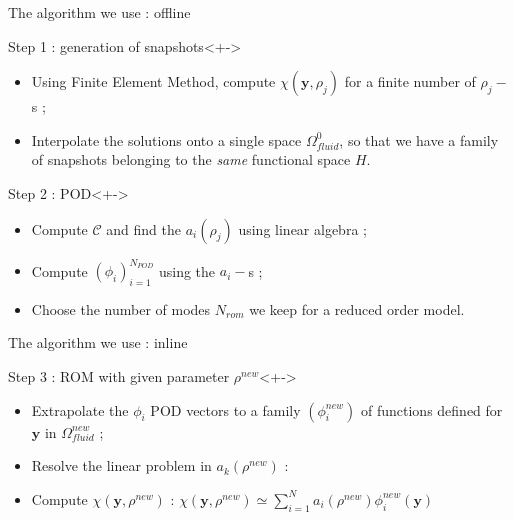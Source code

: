 \begin{frame}{The algorithm we use : offline}
%
\begin{block}{Step 1 : generation of snapshots}<+->
\begin{itemize}
\item<+-> Using Finite Element Method, compute $\chi(\mathbf{y},\rho_j)$ for a finite number of $\rho_j-$s ;
\item<+-> Interpolate the solutions onto a single space $\Omega_{fluid}^0$, %
so that we have a family of snapshots belonging to the \emph{same} functional space $H$.
\end{itemize}
\end{block}
%
\begin{block}{Step 2 : POD}<+->
\begin{itemize}
\item<+-> Compute $\mathcal{C}$ and find the $a_i(\rho_j)$ using linear algebra ;
\item<+-> Compute $(\phi_i)_{i=1}^{N_{POD}}$ using the $a_i-$s ;
\item<+-> Choose the number of modes $N_{rom}$ we keep for a reduced order model.
\end{itemize}
\end{block}
%
\end{frame}

\begin{frame}{The algorithm we use : inline}
%
\begin{block}{Step 3 : ROM with given parameter $\rho^{new}$}<+->
\begin{itemize}
\item<+-> Extrapolate the $\phi_i$ POD vectors to a family $(\phi_i^{new})$ of functions defined for $\mathbf{y}$ in $\Omega_{fluid}^{new}$ ;
\item<+-> Resolve the linear problem in $a_k(\rho^{new})$ :
\end{itemize}
\begin{itemize}
\item<+-> Compute $\chi(\mathbf{y},\rho^{new})$ : $\chi\left(\mathbf{y},\rho^{new}\right)\simeq \sum\limits_{i=1}^N a_i \left(\rho^{new}\right)\phi_i^{new}(\mathbf{y})$
\end{itemize}
\end{block}
%
\end{frame}
